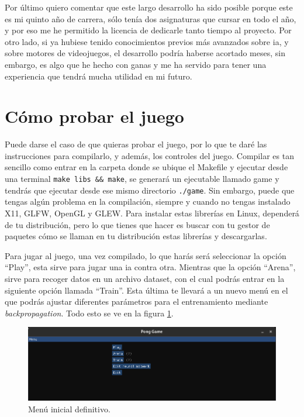 Por último quiero comentar que este largo desarrollo ha sido posible porque este es mi quinto año de carrera, sólo tenía dos asignaturas que cursar en todo el año, y por eso me he permitido la licencia de dedicarle tanto tiempo al proyecto. Por otro lado, si ya hubiese tenido conocimientos previos más avanzados sobre \gls{ia}, y sobre motores de videojuegos, el desarrollo podría haberse acortado meses, sin embargo, es algo que he hecho con ganas y me ha servido para tener una experiencia que tendrá mucha utilidad en mi futuro.

\section{Cómo probar el juego}
Puede darse el caso de que quieras probar el juego, por lo que te daré las instrucciones para compilarlo, y además, los controles del juego.
Compilar es tan sencillo como entrar en la carpeta donde se ubique el Makefile y ejecutar desde una terminal \texttt{make libs \&\& make}, se generará un ejecutable llamado game y tendrás que ejecutar desde ese mismo directorio \texttt{./game}. Sin embargo, puede que tengas algún problema en la compilación, siempre y cuando no tengas instalado X11, GLFW, OpenGL y GLEW. Para instalar estas librerías en Linux, dependerá de tu distribución, pero lo que tienes que hacer es buscar con tu gestor de paquetes cómo se llaman en tu distribución estas librerías y descargarlas.

Para jugar al juego, una vez compilado, lo que harás será seleccionar la opción ``Play'', esta sirve para jugar una \gls{ia} contra otra. Mientras que la opción ``Arena'', sirve para recoger datos en un archivo dataset, con el cual podrás entrar en la siguiente opción llamada ``Train''. Esta última te llevará a un nuevo menú en el que podrás ajustar diferentes parámetros para el entrenamiento mediante \textit{backpropagation}. Todo esto se ve en la figura \ref{Menu inicial definitivo}.
\begin{figure}[H]
	\centering
	\includegraphics[width=15cm]{archivos/imagenes/menu-inicia-definitivo.png}
	\caption{Menú inicial definitivo.}
	\label{Menu inicial definitivo}
\end{figure}

